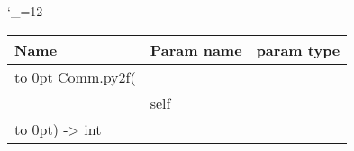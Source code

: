 \begingroup \catcode`\_=12 \tt
\begin{tabular}{lll}
\toprule
\textrm{Name}&\textrm{Param name}&\textrm{param type}\\
\midrule
\hbox to 0pt {Comm.py2f(\hss}\\
& self\\
\hbox to 0pt{) -> int\hss}\\
\bottomrule
\end{tabular}
\endgroup
